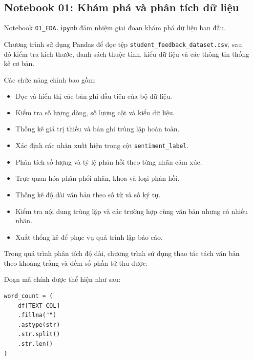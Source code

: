 \subsection{Notebook 01: Khám phá và phân tích dữ liệu}

Notebook \texttt{01\_EDA.ipynb} đảm nhiệm giai đoạn khám phá dữ liệu ban đầu.

Chương trình sử dụng Pandas để đọc tệp \texttt{student\_feedback\_dataset.csv}, sau đó kiểm tra kích thước, danh sách thuộc tính, kiểu dữ liệu và các thông tin thống kê cơ bản.

Các chức năng chính bao gồm:

\begin{itemize}
    \item Đọc và hiển thị các bản ghi đầu tiên của bộ dữ liệu.

    \item Kiểm tra số lượng dòng, số lượng cột và kiểu dữ liệu.

    \item Thống kê giá trị thiếu và bản ghi trùng lặp hoàn toàn.

    \item Xác định các nhãn xuất hiện trong cột \texttt{sentiment\_label}.

    \item Phân tích số lượng và tỷ lệ phản hồi theo từng nhãn cảm xúc.

    \item Trực quan hóa phân phối nhãn, khoa và loại phản hồi.

    \item Thống kê độ dài văn bản theo số từ và số ký tự.

    \item Kiểm tra nội dung trùng lặp và các trường hợp cùng văn bản nhưng có nhiều nhãn.

    \item Xuất thống kê để phục vụ quá trình lập báo cáo.
\end{itemize}

Trong quá trình phân tích độ dài, chương trình sử dụng thao tác tách văn bản theo khoảng trắng và đếm số phần tử thu được.

Đoạn mã chính được thể hiện như sau:

\begin{verbatim}
word_count = (
    df[TEXT_COL]
    .fillna("")
    .astype(str)
    .str.split()
    .str.len()
)
\end{verbatim}

